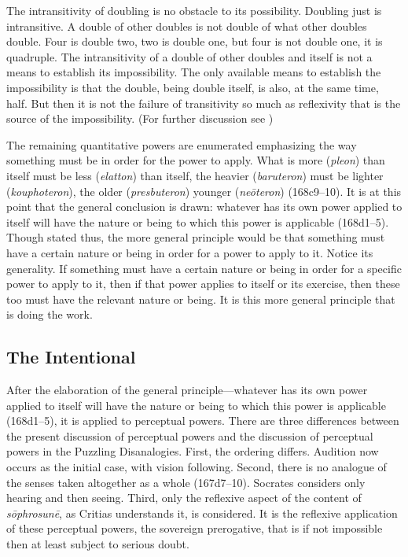 The intransitivity of doubling is no obstacle to its possibility. Doubling just is intransitive. A double of other doubles is not double of what other doubles double. Four is double two, two is double one, but four is not double one, it is quadruple. The intransitivity of a double of other doubles and itself is not a means to establish its impossibility. The only available means to establish the impossibility is that the double, being double itself, is also, at the same time, half. But then it is not the failure of transitivity so much as reflexivity that is the source of the impossibility. (For further discussion see \citealt[4 n10]{McCabe:2007ss})

The remaining quantitative powers are enumerated emphasizing the way something must be in order for the power to apply. What is more (\emph{pleon}) than itself must be less (\emph{elatton}) than itself, the heavier (\emph{baruteron}) must be lighter (\emph{kouphoteron}), the older (\emph{presbuteron}) younger (\emph{neōteron}) (168c9–10). It is at this point that the general conclusion is drawn: whatever has its own power applied to itself will have the nature or being to which this power is applicable (168d1–5). Though stated thus, the more general principle would be that something must have a certain nature or being in order for a power to apply to it. Notice its generality. If something must have a certain nature or being in order for a specific power to apply to it, then if that power applies to itself or its exercise, then these too must have the relevant nature or being. It is this more general principle that is doing the work.


\subsection{The Intentional} %
\label{sub:the_intentional}

After the elaboration of the general principle—whatever has its own power applied to itself will have the nature or being to which this power is applicable (168d1–5), it is applied to perceptual powers. There are three differences between the present discussion of perceptual powers and the discussion of perceptual powers in the Puzzling Disanalogies. First, the ordering differs. Audition now occurs as the initial case, with vision following. Second, there is no analogue of the senses taken altogether as a whole (167d7–10). Socrates considers only hearing and then seeing. Third, only the reflexive aspect of the content of \emph{sōphrosunē}, as Critias understands it, is considered. It is the reflexive application of these perceptual powers, the sovereign prerogative, that is if not impossible then at least subject to serious doubt.

